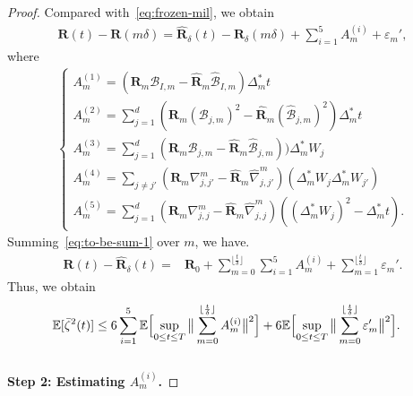 \documentclass[11pt, a4paper, onecolumn]{article}
\newcommand{\E}{\mathbb{E}}
\newcommand{\m}{m}
\newcommand{\bfR}{\mathbf{R}}
\newcommand{\B}{\mathcal{B}}
\newcommand{\hatB}{\widehat{\B}}
\newcommand{\hatR}{\widehat{\bfR}}
\newcommand{\BIms}{{\B_{I,\m}}}
\newcommand{\Bjms}{{\B_{j,\m}}}
\newcommand{\hBIms}{{\hatB_{I,\m}}}
\newcommand{\hBjms}{{\hatB_{j,\m}}}
\newcommand{\Dms}{{\Delta^{*}_{m}}}
\newcommand{\njjms}{ {\nabla_{j,j}^{\m}} }
\newcommand{\njjpms}{ {\nabla_{j,j'}^{\m}} }
\newcommand{\hnjjms}{ {\widehat{\nabla}_{j,j}^{\m}} }
\newcommand{\hnjjpms}{ {\widehat{\nabla}_{j,j'}^{\m}} }
\newcommand{\sumub}{{\lfloor \frac{t}{\delta} \rfloor}}
\newcommand{\hRms}{{\hatR_\m}}
\newcommand{\Rms}{{\bfR_\m}}
\newcommand{\eprm}{\varepsilon_m'}
\newcommand{\EsupN}[1]{\E\Bigl[ \sup_{0 \le t\le T} \big\| \sum_{m=0}^{\sumub} #1 \big\|^2 \Bigr]}
\begin{document}
\begin{appendices}
\begin{proof}
Compared with~\cref{eq:frozen-mil}, we obtain
\begin{align}\label{eq:to-be-sum-1}
    \bfR(t) - \bfR(m\delta) = \hatR_\delta(t) - \hatR_{\delta}(m\delta) + \sum_{i=1}^5 A^{(i)}_m + \eprm, 
\end{align}
where
\begin{align*}
\begin{cases}
    A^{(1)}_m = (\Rms \BIms - \hRms \hBIms) \Dms t\\ 
    A^{(2)}_m =  \sum_{j=1}^d(\Rms (\Bjms)^2 - \hRms (\hBjms)^2) \Dms t \\
    A^{(3)}_m =  \sum_{j=1}^d(\Rms \Bjms - \hRms \hBjms))\Dms W_j \\
    A^{(4)}_m = \sum_{j\ne j'} (\Rms \njjpms - \hRms \hnjjpms)(\Dms W_j \Dms W_{j'}) \\
    A^{(5)}_m = \sum_{j=1}^d (\Rms \njjms - \hRms \hnjjms)((\Dms W_j)^2-\Dms t).
\end{cases}
\end{align*}
Summing~\cref{eq:to-be-sum-1} over $m$, we have.
\begin{align*}
    \bfR(t) - \hatR_\delta(t) =& \bfR_0 + \sum_{m=0}^{\sumub}\sum_{i=1}^5 A^{(i)}_m+ \sum_{m=1}^{\sumub}\eprm.
\end{align*}
Thus, we obtain
\begin{align}{2}\label{eq:zeta}
 \E[\bar{\zeta}^2(t)]\le 6 \sum_{i=1}^5 \EsupN{A^{(i)}_m} +  6\EsupN{\eprm}. & 
\end{align}
\\

\noindent\textbf{Step 2:  Estimating $A^{(i)}_m$.} 



\end{proof}
\end{appendices}
\end{document}
